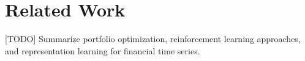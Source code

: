 \section{Related Work}
\label{sec:related-work}

[TODO] Summarize portfolio optimization, reinforcement learning approaches, and representation learning for financial time series.

